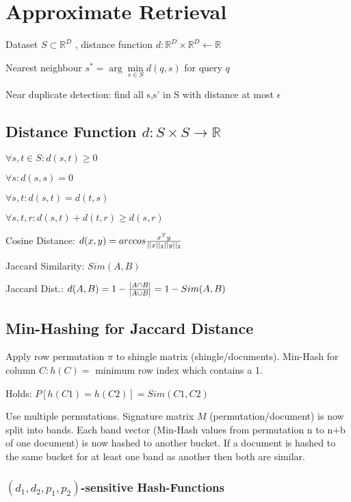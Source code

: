 \documentclass[a4paper,11pt,twocolumn]{article}
\author{Matthias Ganz}
\begin{document}
\section{Approximate Retrieval}
Dataset $S \subset \mathbb{R}^D$ , distance function $d: \mathbb{R}^D \times \mathbb{R}^D \leftarrow \mathbb{R}$

Nearest neighbour $s^* = \arg\min \limits_{s \in S} d(q,s) $ for query $q$

Near duplicate detection: find all s,s' in S with distance at most $\epsilon$

\subsection{Distance Function $d: S \times S  \rightarrow \mathbb{R}$}

$\forall s,t \in S : d(s,t) \geq 0$

$\forall s: d(s,s) = 0$

$\forall s,t:d(s,t) = d(t,s)$

$\forall s,t,r : d(s,t) + d(t,r) \geq d(s,r)$

Cosine Distance: $d(x,y) = arccos  {{x^T y}\over{ ||x||_2 ||y||_2}} $

Jaccard Similarity: $Sim(A,B)$

Jaccard Dist.: $d(A,B) = 1 - {{|A \cap B|}\over{|A \cup B|}} = 1 - Sim(A,B) $


\subsection{Min-Hashing for Jaccard Distance}
Apply row permutation $\pi$ to shingle matrix (shingle/documents). Min-Hash for column $C: h(C) =$ minimum row index which contains a 1.

Holds: $P[h(C1) = h(C2)] = Sim (C1,C2)$

Use multiple permutations. Signature matrix $M$ (permutation/document) is now split into bands. Each band vector (Min-Hash values from permutation n to n+b of one document) is now hashed to another bucket. If a document is hashed to the same bucket for at least one band as another then both are similar.


\subsubsection{$(d_1,d_2,p_1,p_2)$-sensitive Hash-Functions}
\end{document}
